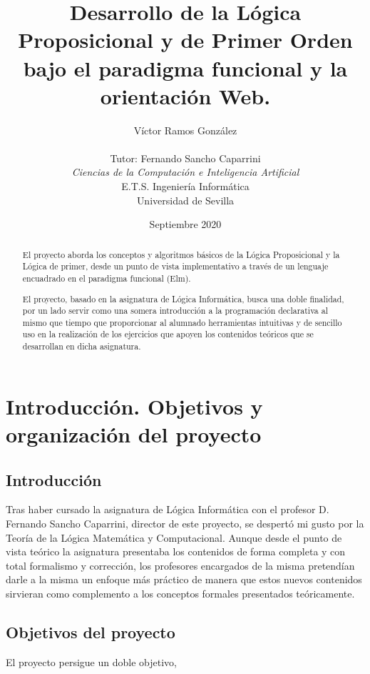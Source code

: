 \documentclass[a4paper]{report}
\title{Desarrollo de la Lógica Proposicional y de Primer Orden bajo el paradigma funcional y la orientación Web.}
\author{Víctor Ramos González\\\\
   Tutor: Fernando Sancho Caparrini\\
   \textit{Ciencias de la Computación e Inteligencia Artificial}\\
   E.T.S. Ingeniería Informática\\
   Universidad de Sevilla\\
  \vspace{8cm}
  \date{Septiembre 2020}
}
\def\blankpage{%
      \clearpage%
      \thispagestyle{empty}%
      \addtocounter{page}{0}%
      \null%
      \clearpage}
\begin{document}
\renewcommand{\tablename}{Tabla}

\dominitoc




\blankpage

\maketitle

\begin{abstract}

El proyecto aborda los conceptos y algoritmos básicos de la Lógica Proposicional y la Lógica de primer, desde un punto de vista implementativo a través de un lenguaje encuadrado en el paradigma funcional (Elm).

El proyecto, basado en la asignatura de Lógica Informática, busca una doble finalidad, por un lado servir como una somera introducción a la programación declarativa al mismo que tiempo que proporcionar al alumnado  herramientas intuitivas y de sencillo uso en la realización de los ejercicios que apoyen los contenidos teóricos que se desarrollan en dicha asignatura.
\end{abstract}

\tableofcontents

\newpage


\chapter{Introducción. Objetivos y organización del proyecto}
\renewcommand{\mtctitle}{}
\mtcskip
\minitoc
\newpage

\section{Introducción}

Tras haber cursado la asignatura de Lógica Informática con el profesor D. Fernando Sancho Caparrini, director de este proyecto, se despertó mi gusto por la Teoría de la Lógica Matemática y Computacional. Aunque desde el punto de vista teórico la asignatura presentaba los contenidos de forma completa y con total formalismo y corrección, los profesores encargados de la misma pretendían darle a la misma un enfoque más práctico de manera que estos nuevos contenidos sirvieran como complemento a los conceptos formales presentados teóricamente.


\section{Objetivos del proyecto}
El proyecto persigue un doble objetivo,
\end{document}
